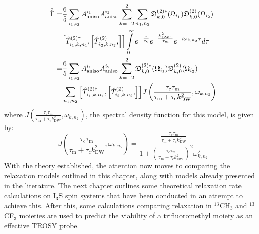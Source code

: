\begin{equation}
\begin{split}
\hat{\hat{\Gamma}} = &\frac{6}{5} \sum \limits_{i_1, i_2} A_{\text{aniso}}^{i_1} A_{\text{aniso}}^{i_{2}} \sum \limits_{k = -2}^2 \sum \limits_{n_1, n_2} \mathfrak{D}_{k,0}^{(2)*} (\Omega_{i_1}) \mathfrak{D}_{k,0}^{(2)} (\Omega_{i_2}) \\
&\comm{\hat{T}_{i_1, k, n_1}^{(2) \dagger}}{\comm{\hat{T}_{i_2, k, n_2}^{(2)}}{}}\int \limits_0^{\infty} e^{-\frac{\tau}{\tau_{\text{c}}}} e^{-\frac{k_{\text{DW}}^2 \tau}{\tau_{\text{m}}}} e^{-i \omega_{k, n_2} \tau} d \tau \\
= &\frac{6}{5} \sum \limits_{i_1, i_2} A_{\text{aniso}}^{i_1} A_{\text{aniso}}^{i_{2}} \sum \limits_{k = -2}^2 \mathfrak{D}_{k,0}^{(2)*} (\Omega_{i_1}) \mathfrak{D}_{k,0}^{(2)} (\Omega_{i_2}) \\
&\sum \limits_{n_1, n_2} \comm{\hat{T}_{i_1, k, n_1}^{(2) \dagger}}{\comm{\hat{T}_{i_2, k, n_2}^{(2)}}{}} J\left(\frac{\tau_{\text{c}} \tau_{\text{m}}}{\tau_{\text{m}} + \tau_{\text{c}} k_{\text{DW}}^2}, \omega_{k,n_2}\right)
\end{split}
\end{equation}
where $J\left(\frac{\tau_{\text{c}} \tau_{\text{m}}}{\tau_{\text{m}} + \tau_{\text{c}} k_{\text{DW}}^2}, \omega_{k,n_2}\right)$, the spectral density function for this model, is given by:
\begin{equation}
\label{SpecDenMeth}
J\left(\frac{\tau_{\text{c}} \tau_{\text{m}}}{\tau_{\text{m}} + \tau_{\text{c}} k_{\text{DW}}^2}, \omega_{k,n_2}\right) = \frac{\frac{\tau_{\text{c}} \tau_{\text{m}}}{\tau_{\text{m}} + \tau_{\text{c}} k_{\text{DW}}^2}}{1 + \left(\frac{\tau_{\text{c}} \tau_{\text{m}}}{\tau_{\text{m}} + \tau_{\text{c}} k_{\text{DW}}^2}\right)^2 \omega_{k,n_2}^2}
\end{equation}
With the theory established, the attention now moves to comparing the relaxation models outlined in this chapter, along with models already presented in the literature. The next chapter outlines some theoretical relaxation rate calculations on I$_3$S spin systems that have been conducted in an attempt to achieve this. After this, some calculations comparing relaxation in $^{13}$CH$_3$ and $^{13}$CF$_3$ moieties are used to predict the viability of a trifluoromethyl moiety as an effective TROSY probe.